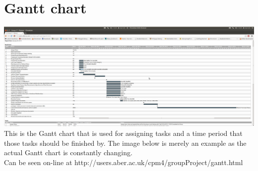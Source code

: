 \documentclass{project}
\begin{document}
\section{Gantt chart}
\includegraphics[angle=270, scale=0.3]{gantt.png}\\
This is the Gantt chart that is used for assigning tasks and a time period that those
tasks should be finished by. The image below is merely an example as the actual
Gantt chart is constantly changing.\\
Can be seen on-line at http://users.aber.ac.uk/cpm4/groupProject/gantt.html
\end{document}
